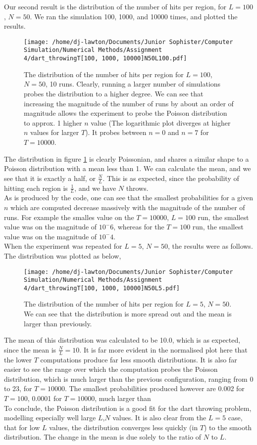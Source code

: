 \documentclass{article}
\theoremstyle{definition}
\theoremstyle{remark}
\begin{document}
\indent Our second result is the distribution of the number of hits per region, for $L=100$, $N=50$. We ran the simulation 100, 1000, and 10000 times, and plotted the results.
\begin{figure}[H]
    \centering
    \texttt{[image: /home/dj-lawton/Documents/Junior Sophister/Computer Simulation/Numerical Methods/Assignment 4/dart\_throwingT[100, 1000, 10000]N50L100.pdf]}
    \caption{\label{fig: 100_50_10} The distribution of the number of hits per region for $L=100$, $N=50$, 10 runs. Clearly, running a larger number of simulations probes the distribution to a higher degree. We can see that increasing the magnitude of the number of runs by about an order of magnitude allows the experiment to probe the Poisson distribution to approx. 1 higher $n$ value (The logarithmic plot diverges at higher $n$ values for larger $T$). It probes between $n=0$ and $n=7$ for $T=10000$.}
\end{figure}
The distribution in figure \ref{fig: 100_50_10} is clearly Poissonian, and shares a similar shape to a Poisson distribution with a mean less than 1. We can calculate the mean, and we see that it is exactly a half, or $\frac{N}{L}$. This is as expected, since the probability of hitting each region is $\frac{1}{L}$, and we have $N$ throws.\\
\indent As is produced by the code, one can see that the smallest probabilities for a given $n$ which are computed decrease massively with the magnitude of the number of runs. For example the smalles value on the $T = 10000$, $L = 100$ run, the smallest value was on the magnitude of $10^-6$, whereas for the $T = 100$ run, the smallest value was on the magnitude of $10^-4$.\\
\indent When the experiment was repeated for $L=5$, $N=50$, the results were as follows. The distribution was plotted as below,
\begin{figure}[H]
    \centering
    \texttt{[image: /home/dj-lawton/Documents/Junior Sophister/Computer Simulation/Numerical Methods/Assignment 4/dart\_throwingT[100, 1000, 10000]N50L5.pdf]}
    \caption{\label{fig: 5_50_10} The distribution of the number of hits per region for $L=5$, $N=50$. We can see that the distribution is more spread out and the mean is larger than previously.}
\end{figure}
The mean of this distribution was calculated to be 10.0, which is as expected, since the mean is $\frac{N}{L}=10$. It is far more evident in the normalised plot here that the lower $T$ computations produce far less smooth distributions. It is also far easier to see the range over which the computation probes the Poisson distribution, which is much larger than the previous configuration, ranging from 0 to 23, for $T = 10000$. The smallest probabilities produced however are 0.002 for $T = 100$, 0.0001 for $T = 10000$, much larger than \\
\indent To conclude, the Poisson distribution is a good fit for the dart throwing problem, modelling especially well large $L$,$N$ values. It is also clear from the $L=5$ case, that for low $L$ values, the distribution converges less quickly (in $T$) to the smooth distribution. The change in the mean is due solely to the ratio of $N$ to $L$.\\
\end{document}
